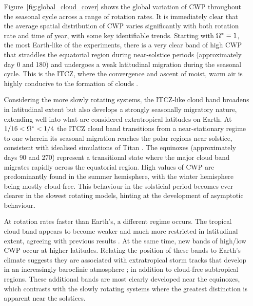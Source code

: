 Figure~\ref{fig:global_cloud_cover} shows the global variation of CWP throughout the seasonal cycle across a range of rotation rates. It is immediately clear that the average spatial distribution of CWP varies significantly with both rotation rate and time of year, with some key identifiable trends. Starting with $\Omega^*=1$, the most Earth-like of the experiments, there is a very clear band of high CWP that straddles the equatorial region during near-solstice periods (approximately day 0 and 180) and undergoes a weak latitudinal migration during the seasonal cycle. This is the ITCZ, where the convergence and ascent of moist, warm air is highly conducive to the formation of clouds \citep{pierrehumbert2010-Principles}.

Considering the more slowly rotating systems, the ITCZ-like cloud band broadens in latitudinal extent but also develops a strongly seasonally migratory nature, extending well into what are considered extratropical latitudes on Earth. At $1/16<\Omega^*<1/4$ the ITCZ cloud band transitions from a near-stationary regime to one wherein its seasonal migration reaches the polar regions near solstice, consistent with idealised simulations of Titan \citep{mitchell2006-Dynamics}. The equinoxes (approximately days 90 and 270) represent a transitional state where the major cloud band migrates rapidly across the equatorial region. High values of CWP are predominantly found in the summer hemisphere, with the winter hemisphere being mostly cloud-free. This behaviour in the solsticial period becomes ever clearer in the slowest rotating models, hinting at the development of asymptotic behaviour.

At rotation rates faster than Earth's, a different regime occurs. The tropical cloud band appears to become weaker and much more restricted in latitudinal extent, agreeing with previous results \citep{yang2013-STABILIZING}. At the same time, new bands of high/low CWP occur at higher latitudes. Relating the position of these bands to Earth's climate suggests they are associated with extratropical storm tracks that develop in an increasingly baroclinic atmosphere \citep{kaspi2013-Role, shaw2016-Storm}; in addition to cloud-free subtropical regions. These additional bands are most clearly developed near the equinoxes, which contrasts with the slowly rotating systems where the greatest distinction is apparent near the solstices.



